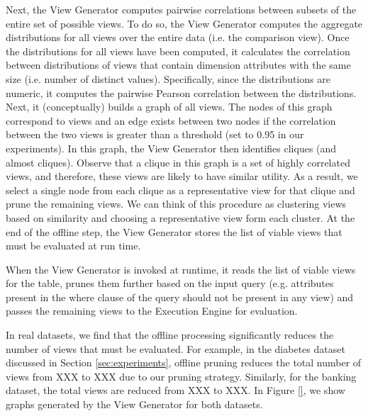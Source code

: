 Next, the View Generator computes pairwise correlations between subsets of the
entire set of possible views.
To do so, the View Generator computes the aggregate distributions for all views
over the entire data (i.e. the comparison view). 
Once the distributions for all views have been computed, it calculates the
correlation between distributions of views that contain dimension attributes
with the same size (i.e. number of distinct values).
Specifically, since the distributions are numeric, it computes the pairwise
Pearson correlation between the distributions.
Next, it (conceptually) builds a graph of all views. 
The nodes of this graph correspond to views and an edge exists between two nodes
if the correlation between the two views is greater than a threshold (set to 0.95 in
our experiments). 
In this graph, the View Generator then identifies cliques (and almost cliques).
Observe that a clique in this graph is a set of highly correlated views,
and therefore, these views are likely to have similar utility. 
As a result, we select a
single node from each clique as a representative view for that clique and
prune the remaining views. 
We can think of this procedure as clustering views based on similarity and
choosing a representative view form each cluster.
At the end of the offline step, the View Generator stores the list of
viable views that must be evaluated at run time.

When the View Generator is invoked at runtime, it reads the list of viable
views for the table, prunes them further based on the input query (e.g.
attributes present in the where clause of the query should not be present in
any view) and passes the remaining views to the Execution Engine for
evaluation.

In real datasets, we find that the offline processing significantly
reduces the number of views that must be evaluated. 
For example, in the
diabetes dataset discussed in Section \ref{sec:experiments}, offline pruning
reduces the total number of views from XXX to XXX due to our pruning
strategy. Similarly, for the banking dataset, the total views are
reduced from XXX to XXX. In Figure \ref{}, we show graphs generated by the
View Generator for both datasets.

